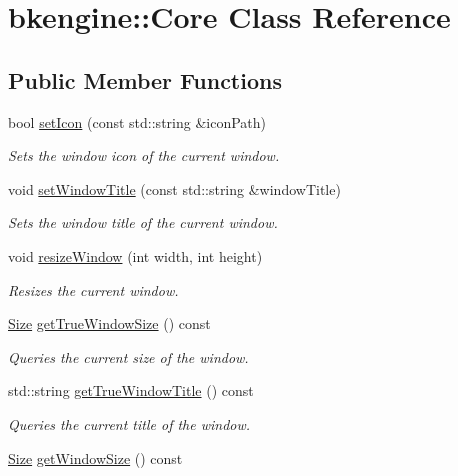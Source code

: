 \hypertarget{classbkengine_1_1Core}{}\section{bkengine\+:\+:Core Class Reference}
\label{classbkengine_1_1Core}
\subsection*{Public Member Functions}
\begin{DoxyCompactItemize}
\item 
bool \hyperlink{classbkengine_1_1Core_a9328f09fc3ddd00de43f1dfe93f77c74}{set\+Icon} (const std\+::string \&icon\+Path)
\begin{DoxyCompactList}\small\item\em Sets the window icon of the current window. \end{DoxyCompactList}\item 
void \hyperlink{classbkengine_1_1Core_a6c510c45e9463399359664965918b431}{set\+Window\+Title} (const std\+::string \&window\+Title)
\begin{DoxyCompactList}\small\item\em Sets the window title of the current window. \end{DoxyCompactList}\item 
void \hyperlink{classbkengine_1_1Core_a88b8c671689df472845515953b5b7b2d}{resize\+Window} (int width, int height)
\begin{DoxyCompactList}\small\item\em Resizes the current window. \end{DoxyCompactList}\item 
\hyperlink{structbkengine_1_1Size}{Size} \hyperlink{classbkengine_1_1Core_a5238bcd142db1cb5a15cd3d6733a92da}{get\+True\+Window\+Size} () const
\begin{DoxyCompactList}\small\item\em Queries the current size of the window. \end{DoxyCompactList}\item 
std\+::string \hyperlink{classbkengine_1_1Core_a9fa654f1b1391876dbf77349f979e106}{get\+True\+Window\+Title} () const
\begin{DoxyCompactList}\small\item\em Queries the current title of the window. \end{DoxyCompactList}\item 
\hyperlink{structbkengine_1_1Size}{Size} \hyperlink{classbkengine_1_1Core_a92e101c1e579bd2bc7fee001de816d6f}{get\+Window\+Size} () const

\end{DoxyCompactItemize}
